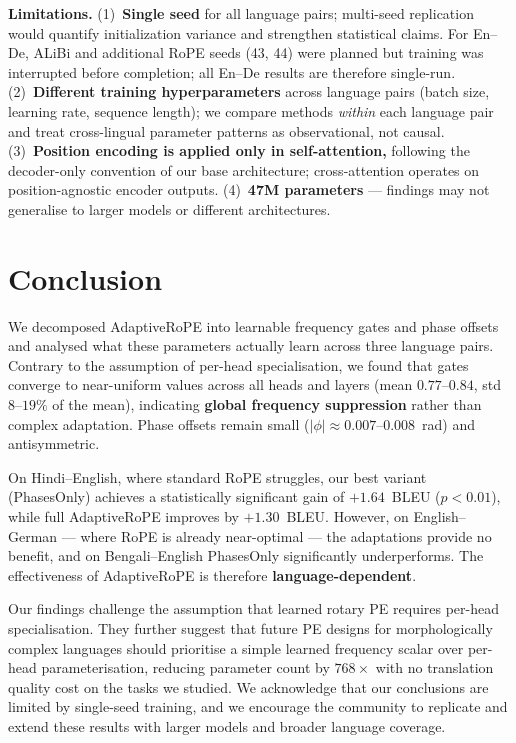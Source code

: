 \documentclass[conference]{IEEEtran}
\begin{document}
\textbf{Limitations.}
(1)~\textbf{Single seed} for all language pairs; multi-seed replication
would quantify initialization variance and strengthen statistical claims.
For En--De, ALiBi and additional RoPE seeds (43, 44) were planned but
training was interrupted before completion; all En--De results are
therefore single-run.
(2)~\textbf{Different training hyperparameters} across language pairs
(batch size, learning rate, sequence length); we compare methods
\emph{within} each language pair and treat cross-lingual parameter patterns
as observational, not causal.
(3)~\textbf{Position encoding is applied only in self-attention,}
following the decoder-only convention of our base architecture;
cross-attention operates on position-agnostic encoder outputs.
(4)~\textbf{47M parameters} --- findings may not generalise to larger
models or different architectures.

\section{Conclusion}
\label{sec:conclusion}

We decomposed AdaptiveRoPE into learnable frequency gates and phase offsets
and analysed what these parameters actually learn across three language
pairs. Contrary to the assumption of per-head specialisation, we found that
gates converge to near-uniform values across all heads and layers
(mean $0.77$--$0.84$, std $8$--$19\%$ of the mean), indicating \textbf{global
frequency suppression} rather than complex adaptation. Phase offsets remain
small ($|\phi| \approx 0.007$--$0.008$~rad) and antisymmetric.

On Hindi--English, where standard RoPE struggles, our best variant
(PhasesOnly) achieves a statistically significant gain of $+1.64$~BLEU
($p<0.01$), while full AdaptiveRoPE improves by $+1.30$~BLEU. However, on
English--German --- where RoPE is already near-optimal --- the adaptations
provide no benefit, and on Bengali--English PhasesOnly significantly
underperforms. The effectiveness of AdaptiveRoPE is therefore
\textbf{language-dependent}.

Our findings challenge the assumption that learned rotary PE requires
per-head specialisation. They further suggest that future PE designs for
morphologically complex languages should prioritise a simple learned
frequency scalar over per-head parameterisation, reducing parameter count
by $768\times$ with no translation quality cost on the tasks we studied.
We acknowledge that our conclusions are limited by single-seed training,
and we encourage the community to replicate and extend these results with
larger models and broader language coverage.



\end{document}
